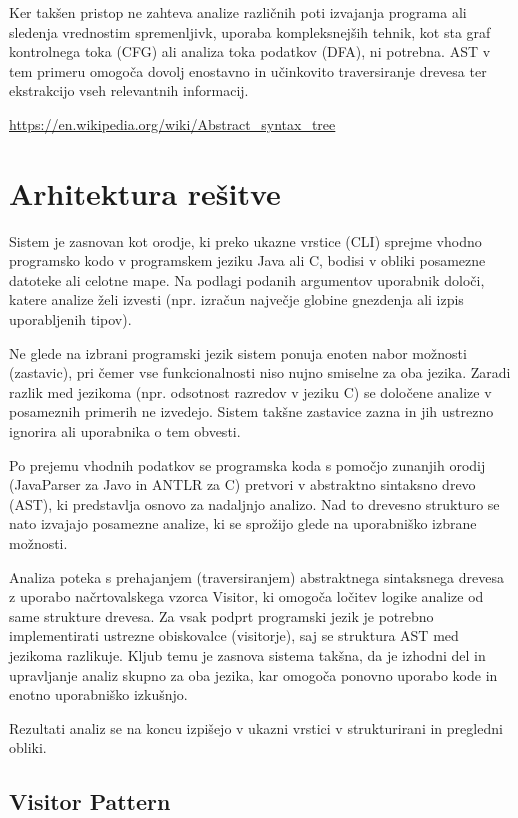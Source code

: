 \documentclass[a4paper,12pt,openright]{book}
\begin{document}
Ker takšen pristop ne zahteva analize različnih poti izvajanja programa ali sledenja vrednostim spremenljivk, uporaba kompleksnejših tehnik, kot sta graf kontrolnega toka (CFG) ali analiza toka podatkov (DFA), ni potrebna. AST v tem primeru omogoča dovolj enostavno in učinkovito traversiranje drevesa ter ekstrakcijo vseh relevantnih informacij.

\url{https://en.wikipedia.org/wiki/Abstract_syntax_tree}

\section{Arhitektura rešitve}

Sistem je zasnovan kot orodje, ki preko ukazne vrstice (CLI) sprejme vhodno programsko kodo v programskem jeziku Java ali C, bodisi v obliki posamezne datoteke ali celotne mape. Na podlagi podanih argumentov uporabnik določi, katere analize želi izvesti (npr. izračun največje globine gnezdenja ali izpis uporabljenih tipov).

Ne glede na izbrani programski jezik sistem ponuja enoten nabor možnosti (zastavic), pri čemer vse funkcionalnosti niso nujno smiselne za oba jezika. Zaradi razlik med jezikoma (npr. odsotnost razredov v jeziku C) se določene analize v posameznih primerih ne izvedejo. Sistem takšne zastavice zazna in jih ustrezno ignorira ali uporabnika o tem obvesti.

Po prejemu vhodnih podatkov se programska koda s pomočjo zunanjih orodij (JavaParser za Javo in ANTLR za C) pretvori v abstraktno sintaksno drevo (AST), ki predstavlja osnovo za nadaljnjo analizo. Nad to drevesno strukturo se nato izvajajo posamezne analize, ki se sprožijo glede na uporabniško izbrane možnosti.

Analiza poteka s prehajanjem (traversiranjem) abstraktnega sintaksnega drevesa z uporabo načrtovalskega vzorca Visitor, ki omogoča ločitev logike analize od same strukture drevesa. Za vsak podprt programski jezik je potrebno implementirati ustrezne obiskovalce (visitorje), saj se struktura AST med jezikoma razlikuje. Kljub temu je zasnova sistema takšna, da je izhodni del in upravljanje analiz skupno za oba jezika, kar omogoča ponovno uporabo kode in enotno uporabniško izkušnjo.

Rezultati analiz se na koncu izpišejo v ukazni vrstici v strukturirani in pregledni obliki.

\subsection{Visitor Pattern}
\end{document}
